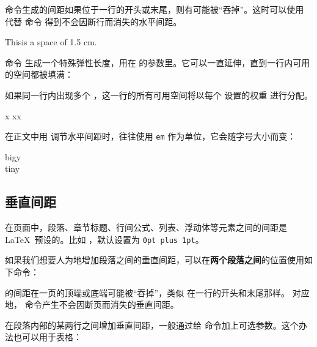  命令生成的间距如果位于一行的开头或末尾，则有可能被“吞掉”。这时可以使用  代替  命令
得到不会因断行而消失的水平间距。

\begin{example}
This\hspace{1.5cm}is a space
of 1.5 cm.
\end{example}

命令  生成一个特殊弹性长度，用在  的参数里。它可以一直延伸，直到一行内可用的空间都被填满：
\begin{command}
\end{command}
如果同一行内出现多个 ，这一行的所有可用空间将以每个  设置的权重  进行分配。

\begin{example}
x
xx
\end{example}

在正文中用  调节水平间距时，往往使用 \texttt{em} 作为单位，它会随字号大小而变：

\begin{example}
{\Large{}big\hspace{1em}y}\\
{\tiny{}tin\hspace{1em}y}
\end{example}

\subsection{垂直间距}

在页面中，段落、章节标题、行间公式、列表、浮动体等元素之间的间距是 \LaTeX\ 预设的。比如  ，默认设置为 \texttt{0pt plus 1pt}。

如果我们想要人为地增加段落之间的垂直间距，可以在\textbf{两个段落之间}的位置使用如下命令：
\begin{command}
\end{command}

 的间距在一页的顶端或底端可能被“吞掉”，类似  在一行的开头和末尾那样。
对应地， 命令产生不会因断页而消失的垂直间距。

在段落内部的某两行之间增加垂直间距，一般通过给  命令加上可选参数。这个办法也可以用于表格：
\begin{command}
\end{command}

